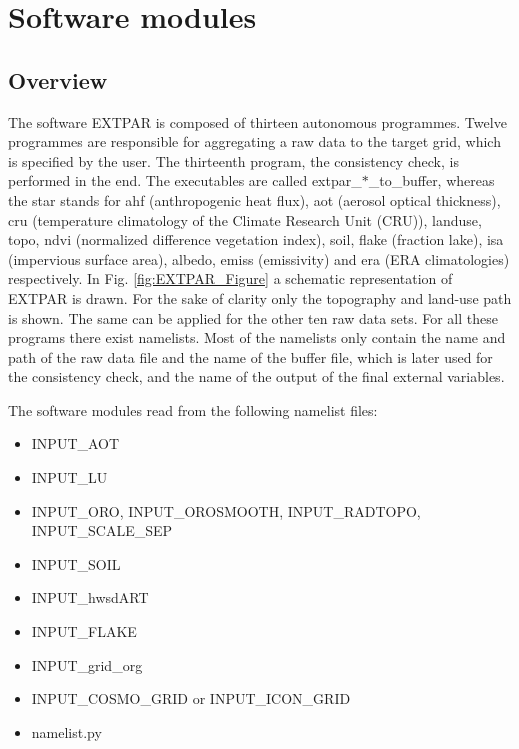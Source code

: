 \documentclass[a4paper,10pt,DIV14,BCOR1cm,titlepage,twoside]{scrartcl}
\begin{document}

\section{Software modules}\label{Software_modules}
\subsection{Overview}\label{Overview}
The software EXTPAR is composed of thirteen autonomous programmes. Twelve programmes are responsible for aggregating a raw data to the target grid, which is specified by the user. The thirteenth program, the consistency check, is performed in the end. The executables are called extpar\_$\ast$\_to\_buffer, whereas the star stands for ahf (anthropogenic heat flux), aot (aerosol optical thickness), cru (temperature climatology of the Climate Research Unit (CRU)), landuse, topo, ndvi (normalized difference vegetation index), soil, flake (fraction lake), isa (impervious surface area), albedo, emiss (emissivity) and era (ERA climatologies) respectively. In Fig. \ref{fig:EXTPAR_Figure} a schematic representation of EXTPAR is drawn. For the sake of clarity only the topography and land-use path is shown. The same can be applied for the other ten raw data sets. For all these programs there exist namelists. Most of the namelists only contain the name and path of the raw data file and the name of the buffer file, which is later used for the consistency check, and the name of the output of the final external variables. \par\medskip\noindent

The software modules read from the following namelist files:

\begin{itemize}
  \item INPUT\_AOT
  \item INPUT\_LU
  \item INPUT\_ORO, INPUT\_OROSMOOTH, INPUT\_RADTOPO, INPUT\_SCALE\_SEP
  \item INPUT\_SOIL
  \item INPUT\_hwsdART
  \item INPUT\_FLAKE
  \item INPUT\_grid\_org
  \item INPUT\_COSMO\_GRID or INPUT\_ICON\_GRID
  \item namelist.py
\end{itemize}
\end{document}
